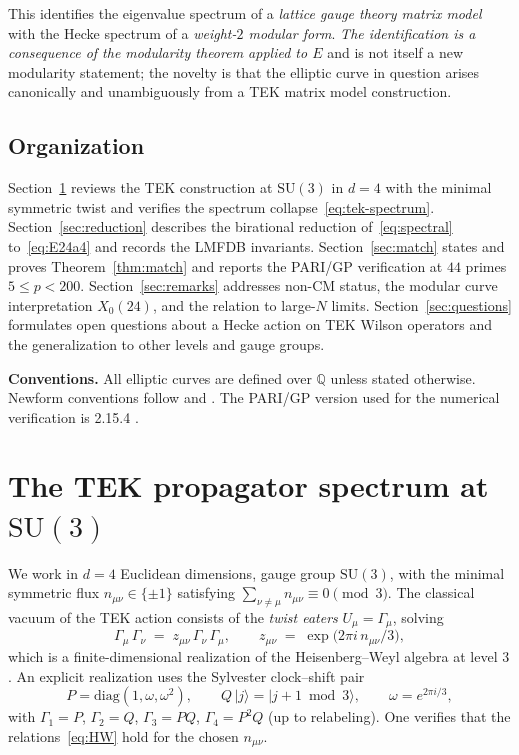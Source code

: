 \documentclass[11pt]{amsart}
\theoremstyle{definition}
\theoremstyle{remark}
\newcommand{\Q}{\mathbb{Q}}
\newcommand{\SU}{\mathrm{SU}}
\begin{document}
This identifies the eigenvalue spectrum of a \emph{lattice gauge
theory matrix model} with the Hecke spectrum of a \emph{weight-\(2\)
modular form}. \emph{The identification is a consequence of the
modularity theorem applied to \(E\)} and is not itself a new
modularity statement; the novelty is that the elliptic curve in
question arises canonically and unambiguously from a TEK matrix
model construction.

\subsection*{Organization}

Section~\ref{sec:tek} reviews the TEK construction at \(\SU(3)\) in
\(d = 4\) with the minimal symmetric twist and verifies the spectrum
collapse~\eqref{eq:tek-spectrum}. Section~\ref{sec:reduction}
describes the birational reduction of~\eqref{eq:spectral}
to~\eqref{eq:E24a4} and records the LMFDB invariants.
Section~\ref{sec:match} states and proves
Theorem~\ref{thm:match} and reports the PARI/GP verification at
\(44\) primes \(5 \le p < 200\). Section~\ref{sec:remarks} addresses
non-CM status, the modular curve interpretation
\(X_{0}(24)\), and the relation to large-\(N\) limits.
Section~\ref{sec:questions} formulates open questions about a
Hecke action on TEK Wilson operators and the generalization to
other levels and gauge groups.

\medskip

\textbf{Conventions.} All elliptic curves are defined over \(\Q\)
unless stated otherwise. Newform conventions follow \cite{LMFDB}
and \cite{Miyake2006}. The PARI/GP version used for the numerical
verification is 2.15.4 \cite{PARI2024}.


\section{The TEK propagator spectrum at \(\SU(3)\)}\label{sec:tek}

We work in \(d = 4\) Euclidean dimensions, gauge group \(\SU(3)\),
with the minimal symmetric flux \(n_{\mu\nu} \in \{\pm 1\}\)
satisfying \(\sum_{\nu \neq \mu} n_{\mu\nu} \equiv 0 \pmod{3}\).
The classical vacuum of the TEK action consists of the
\emph{twist eaters} \(U_{\mu} = \Gamma_{\mu}\), solving
\begin{equation}\label{eq:HW}
  \Gamma_{\mu}\,\Gamma_{\nu}
  \;=\; z_{\mu\nu}\,\Gamma_{\nu}\,\Gamma_{\mu},
  \qquad
  z_{\mu\nu} \;=\; \exp\!\bigl(2\pi i\, n_{\mu\nu}/3\bigr),
\end{equation}
which is a finite-dimensional realization of the Heisenberg--Weyl
algebra at level \(3\). An explicit realization uses the Sylvester
clock--shift pair
\[
  P = \mathrm{diag}(1, \omega, \omega^{2}),
  \qquad
  Q\,|j\rangle = |j + 1 \bmod 3\rangle,
  \qquad
  \omega = e^{2\pi i/3},
\]
with \(\Gamma_{1} = P\), \(\Gamma_{2} = Q\), \(\Gamma_{3} = PQ\),
\(\Gamma_{4} = P^{2}Q\) (up to relabeling). One verifies that the
relations~\eqref{eq:HW} hold for the chosen \(n_{\mu\nu}\).
\end{document}
